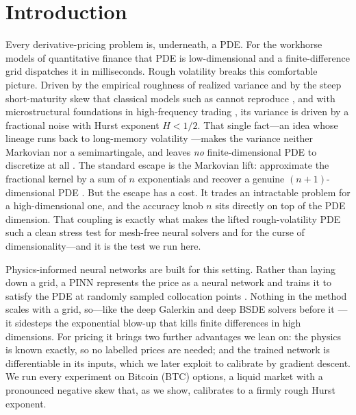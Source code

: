 \documentclass[11pt]{article}
\begin{document}
\section{Introduction}

Every derivative-pricing problem is, underneath, a PDE. For the workhorse models
of quantitative finance that PDE is low-dimensional and a finite-difference grid
dispatches it in milliseconds. Rough volatility breaks this comfortable picture.
Driven by the empirical roughness of realized variance and by the steep
short-maturity skew that classical models such as \citet{heston1993closed} cannot
reproduce \citep{gatheral2018volatility,bennedsen2022decoupling,bayer2016pricing},
and with microstructural foundations in high-frequency trading
\citep{eleuch2018microstructural}, its variance is driven by a fractional noise
with Hurst exponent $H<1/2$. That single fact---an idea whose lineage runs back to
long-memory volatility \citep{comte1998long}---makes the variance neither
Markovian nor a semimartingale, and leaves \emph{no} finite-dimensional PDE to
discretize at all \citep{gatheral2018volatility,eleuch2019characteristic}. The
standard escape is the Markovian lift: approximate the fractional kernel by a sum
of $n$ exponentials and recover a genuine $(n{+}1)$-dimensional PDE
\citep{abijaber2019multifactor,abijaber2019lifting}. But the escape has a cost. It
trades an intractable problem for a high-dimensional one, and the accuracy knob
$n$ sits directly on top of the PDE dimension. That coupling is exactly what makes
the lifted rough-volatility PDE such a clean stress test for mesh-free neural
solvers and for the curse of dimensionality---and it is the test we run here.

Physics-informed neural networks are built for this setting. Rather than laying
down a grid, a PINN represents the price as a neural network and trains it to
satisfy the PDE at randomly sampled collocation points \citep{raissi2019physics}.
Nothing in the method scales with a grid, so---like the deep Galerkin and deep
BSDE solvers before it \citep{sirignano2018dgm,han2018solving}---it sidesteps the
exponential blow-up that kills finite differences in high dimensions. For pricing
it brings two further advantages we lean on: the physics is known exactly, so no
labelled prices are needed; and the trained network is differentiable in its
inputs, which we later exploit to calibrate by gradient descent. We run every
experiment on Bitcoin (BTC) options, a liquid market with a pronounced negative
skew that, as we show, calibrates to a firmly rough Hurst exponent.
\end{document}

